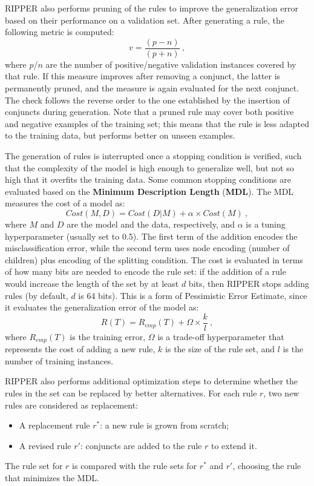 RIPPER also performs pruning of the rules to improve the generalization error based on their performance on a validation set. After generating a rule, the following metric is computed:
\begin{equation*}
    v = \dfrac{(p-n)}{(p+n)} \ ,
\end{equation*}
where $p$/$n$ are the number of positive/negative validation instances covered by that rule. If this measure improves after removing a conjunct, the latter is permanently pruned, and the measure is again evaluated for the next conjunct. The check follows the reverse order to the one established by the insertion of conjuncts during generation. Note that a pruned rule may cover both positive and negative examples of the training set; this means that the rule is less adapted to the training data, but performs better on unseen examples. 

The generation of rules is interrupted once a stopping condition is verified, such that the complexity of the model is high enough to generalize well, but not so high that it overfits the training data. Some common stopping conditions are evaluated based on the \textbf{Minimum Description Length} (\textbf{MDL}). The MDL measures the cost of a model as:
\begin{equation*}
    \textit{Cost}(M, D) = \textit{Cost}(D|M) + \alpha \times \textit{Cost}(M) \ ,
\end{equation*}
where $M$ and $D$ are the model and the data, respectively, and $\alpha$ is a tuning hyperparameter (usually set to 0.5).  The first term of the addition encodes the misclassification error, while the second term uses node encoding (number of children) plus encoding of the splitting condition. The cost is evaluated in terms of how many bits are needed to encode the rule set: if the addition of a rule would increase the length of the set by at least $d$ bits, then RIPPER stops adding rules (by default, $d$ is 64 bits). This is a form of Pessimistic Error Estimate, since it evaluates the generalization error of the model as:
\begin{equation*}
    R(T) = R_{emp}(T) + \Omega \times \dfrac{k}{l} \ ,
\end{equation*}
where $R_{emp}(T)$ is the training error, $\Omega$ is a trade-off hyperparameter that represents the cost of adding a new rule, $k$ is the size of the rule set, and $l$ is the number of training instances.

RIPPER also performs additional optimization steps to determine whether the rules in the set can be replaced by better alternatives. For each rule $r$, two new rules are considered as replacement:
\begin{itemize}
    \item A replacement rule $r^*$: a new rule is grown from scratch;
    \item A revised rule $r'$: conjuncts are added to the rule $r$ to extend it.
\end{itemize}
The rule set for $r$ is compared with the rule sets for $r^*$ and $r'$, choosing the rule that minimizes the MDL.

